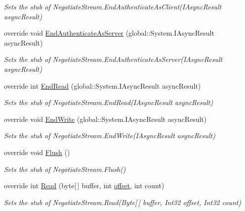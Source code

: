 \begin{DoxyCompactItemize}
\begin{DoxyCompactList}\small\item\em Sets the stub of Negotiate\-Stream.\-End\-Authenticate\-As\-Client(\-I\-Async\-Result async\-Result)\end{DoxyCompactList}\item 
override void \hyperlink{class_system_1_1_net_1_1_security_1_1_fakes_1_1_stub_negotiate_stream_a11153ae274d7641bdfb213edea06f395}{End\-Authenticate\-As\-Server} (global\-::\-System.\-I\-Async\-Result async\-Result)
\begin{DoxyCompactList}\small\item\em Sets the stub of Negotiate\-Stream.\-End\-Authenticate\-As\-Server(\-I\-Async\-Result async\-Result)\end{DoxyCompactList}\item 
override int \hyperlink{class_system_1_1_net_1_1_security_1_1_fakes_1_1_stub_negotiate_stream_a378f581f55c2da95864cd2595978e5a5}{End\-Read} (global\-::\-System.\-I\-Async\-Result async\-Result)
\begin{DoxyCompactList}\small\item\em Sets the stub of Negotiate\-Stream.\-End\-Read(\-I\-Async\-Result async\-Result)\end{DoxyCompactList}\item 
override void \hyperlink{class_system_1_1_net_1_1_security_1_1_fakes_1_1_stub_negotiate_stream_a747b9e4351af20f819a009c535012c81}{End\-Write} (global\-::\-System.\-I\-Async\-Result async\-Result)
\begin{DoxyCompactList}\small\item\em Sets the stub of Negotiate\-Stream.\-End\-Write(\-I\-Async\-Result async\-Result)\end{DoxyCompactList}\item 
override void \hyperlink{class_system_1_1_net_1_1_security_1_1_fakes_1_1_stub_negotiate_stream_a19bcceb223771817f92951516989ba60}{Flush} ()
\begin{DoxyCompactList}\small\item\em Sets the stub of Negotiate\-Stream.\-Flush()\end{DoxyCompactList}\item 
override int \hyperlink{class_system_1_1_net_1_1_security_1_1_fakes_1_1_stub_negotiate_stream_a69980d4bb9ba97c43269ca13080e965d}{Read} (byte\mbox{[}$\,$\mbox{]} buffer, int \hyperlink{jquery-1_810_82_8js_a4a9f594d20d927164551fc7fa4751a2f}{offset}, int count)
\begin{DoxyCompactList}\small\item\em Sets the stub of Negotiate\-Stream.\-Read(\-Byte\mbox{[}$\,$\mbox{]} buffer, Int32 offset, Int32 count)\end{DoxyCompactList}\item 

\end{DoxyCompactItemize}

